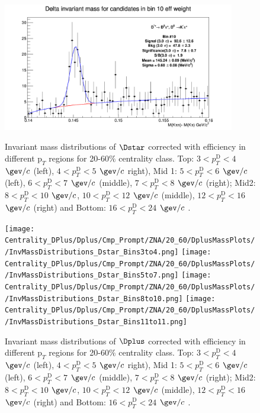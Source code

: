 \begin{figure}[!htp]
{\includegraphics[width=0.6\linewidth, height=5.6cm]{figuresVsCent/Dstar/MassPlots/2060/InvMassDistributions_Dstar_Bins10to10.png}}

\caption{Invariant mass distributions of $\Dstar$ corrected with efficiency in different $\text{p}_T$ regions for 20-60$\%$ centrality class. Top: $3< p_{T}^{\text{D}}< 4$ $\gev/c$ (left), $4< p_{T}^{\text{D}}< 5$ $\gev/c$ right), Mid 1: $5< p_{T}^{\text{D}}< 6$ $\gev/c$ (left), $6 < p_{T}^{\text{D}} < 7$ $\gev/c$ (middle), $7< p_{T}^{\text{D}}< 8$ $\gev/c$ (right); Mid2: $8< p_{T}^{\text{D}}< 10$ $\gev/c$, $10< p_{T}^{\text{D}}< 12$ $\gev/c$  (middle), $12 < p_{T}^{\text{D}}< 16$ $\gev/c$  (right) and Bottom: $16<p_{T}^{\text{D}}< 24$ $\gev/c$ .}
\label{fig:InvMassDs2060}
\end{figure}



\begin{figure}[!htp]
\centering
{\texttt{[image: Centrality\_DPlus/Dplus/Cmp\_Prompt/ZNA/20\_60/DplusMassPlots/
/InvMassDistributions\_Dstar\_Bins3to4.png]}}
{\texttt{[image: Centrality\_DPlus/Dplus/Cmp\_Prompt/ZNA/20\_60/DplusMassPlots/
/InvMassDistributions\_Dstar\_Bins5to7.png]}}
{\texttt{[image: Centrality\_DPlus/Dplus/Cmp\_Prompt/ZNA/20\_60/DplusMassPlots/
/InvMassDistributions\_Dstar\_Bins8to10.png]}}
{\texttt{[image: Centrality\_DPlus/Dplus/Cmp\_Prompt/ZNA/20\_60/DplusMassPlots/
/InvMassDistributions\_Dstar\_Bins11to11.png]}}

\caption{Invariant mass distributions of $\Dplus$ corrected with efficiency in different $\text{p}_T$ regions for 20-60$\%$ centrality class. Top: $3< p_{T}^{\text{D}}< 4$ $\gev/c$ (left), $4< p_{T}^{\text{D}}< 5$ $\gev/c$ right), Mid 1: $5< p_{T}^{\text{D}}< 6$ $\gev/c$ (left), $6 < p_{T}^{\text{D}} < 7$ $\gev/c$ (middle), $7< p_{T}^{\text{D}}< 8$ $\gev/c$ (right); Mid2: $8< p_{T}^{\text{D}}< 10$ $\gev/c$, $10< p_{T}^{\text{D}}< 12$ $\gev/c$  (middle), $12 < p_{T}^{\text{D}}< 16$ $\gev/c$  (right) and Bottom: $16<p_{T}^{\text{D}}< 24$ $\gev/c$ .}
\label{fig:InvMassDplus2060}
\end{figure}


